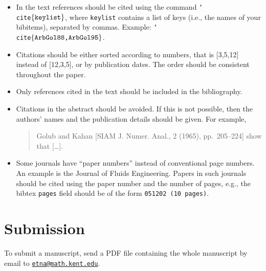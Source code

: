 \documentclass[parskip]{scrartcl}
\begin{document}
\begin{itemize}
\item In the text references should be cited using the command
  \texttt{\char`\\cite$\{\mbox{\texttt{keylist}}\}$},
where \texttt{keylist} contains a list of keys (i.e., the names of your bibitems),
separated by commas. Example:
\texttt{\char`\\cite$\{\mbox{\texttt{ArbGol88,ArbGol95}}\}$}.
%
\item Citations should be either sorted according to numbers, that is [3,5,12]
instead of [12,3,5], or by publication dates. The order should be consistent
throughout the paper.
%
\item Only references cited in the text should be included in the bibliography.
%
\item Citations in the abstract should be avoided. If this is not possible,
then the authors' names and the publication details should be given. For example,

\begin{quote}
  Golub and Kahan [SIAM J. Numer. Anal., 2 (1965), pp.~205--224] show that
  [\dots].
\end{quote}


\item Some journals have ``paper numbers'' instead of conventional page
  numbers.  An example is the Journal of Fluids Engineering. Papers in such
  journals should be cited using the paper number and the number of pages,
  e.g., the bibtex \texttt{pages} field should be of the form \texttt{051202 (10 pages)}.


\end{itemize}

\section{Submission}
To submit a manuscript, send a PDF file containing
the whole manuscript by email to
\href{mailto:etna@math.kent.edu}{\nolinkurl{etna@math.kent.edu}}.
\end{document}
